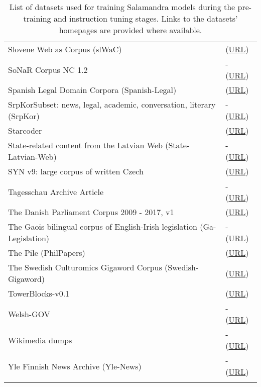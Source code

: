\begin{longtable}{p{} | p{}}
    Slovene Web as Corpus (slWaC) & \citet{erjavec_slwac_2015} (\href{http://nlp.ffzg.hr/resources/corpora/slwac/}{URL}) \\ 
    SoNaR Corpus NC 1.2 & - (\href{https://taalmaterialen.ivdnt.org/download/tstc-sonar-nieuwe-media-corpus-1/}{URL}) \\ 
    Spanish Legal Domain Corpora (Spanish-Legal) & \citet{gutierrez-fandino_spanish_2021} (\href{https://github.com/PlanTL-GOB-ES/lm-legal-es}{URL}) \\ 
    SrpKorSubset: news, legal, academic, conversation, literary (SrpKor) & - (\href{http://www.korpus.matf.bg.ac.rs/}{URL}) \\ 
    Starcoder & \citet{li_starcoder_2023} (\href{https://huggingface.co/datasets/bigcode/starcoderdata}{URL}) \\ 
    State-related content from the Latvian Web (State-Latvian-Web) & - (\href{http://catalog.elra.info/en-us/repository/browse/ELRA-W0169/}{URL}) \\ 
    SYN v9: large corpus of written Czech & \citet{kren_syn_2021} (\href{https://lindat.mff.cuni.cz/repository/xmlui/handle/11234/1-4635}{URL}) \\ 
    Tagesschau Archive Article & - (\href{https://huggingface.co/datasets/bjoernp/tagesschau-2018-2023}{URL}) \\ 
    The Danish Parliament Corpus 2009 - 2017, v1 & \citet{hansen_danish_2018} (\href{http://hdl.handle.net/20.500.12115/8}{URL}) \\ 
    The Gaois bilingual corpus of English-Irish legislation (Ga-Legislation) & - (\href{https://portulanclarin.net/repository/browse/the-gaois-bilingual-corpus-of-english-irish-legislation-processed/daeac17c9e3511ea9b7f02420a000407b83de243dc0b469aab41084386c5b80f/}{URL}) \\ 
    The Pile (PhilPapers) & \citet{gao_pile_2021} (\href{https://github.com/thoppe/The-Pile-PhilPapers}{URL}) \\ 
    The Swedish Culturomics Gigaword Corpus (Swedish-Gigaword) & \citet{rodven-eide_swedish_2016} (\href{https://spraakbanken.gu.se/en/resources/gigaword}{URL}) \\ 
    TowerBlocks-v0.1 & \citet{alves_tower_2024} (\href{https://huggingface.co/datasets/Unbabel/TowerBlocks-v0.1}{URL}) \\ 
    Welsh-GOV & - (\href{https://www.llyw.cymru}{URL}) \\ 
    Wikimedia dumps & - (\href{https://dumps.wikimedia.org/}{URL}) \\ 
    Yle Finnish News Archive (Yle-News) & - (\href{http://urn.fi/urn:nbn:fi:lb-2021050401}{URL}) \\ \hline
    \caption{List of datasets used for training Salamandra models during the pre-training and instruction tuning stages. Links to the datasets' homepages are provided where available.}
    \label{table:datasets}
\end{longtable}